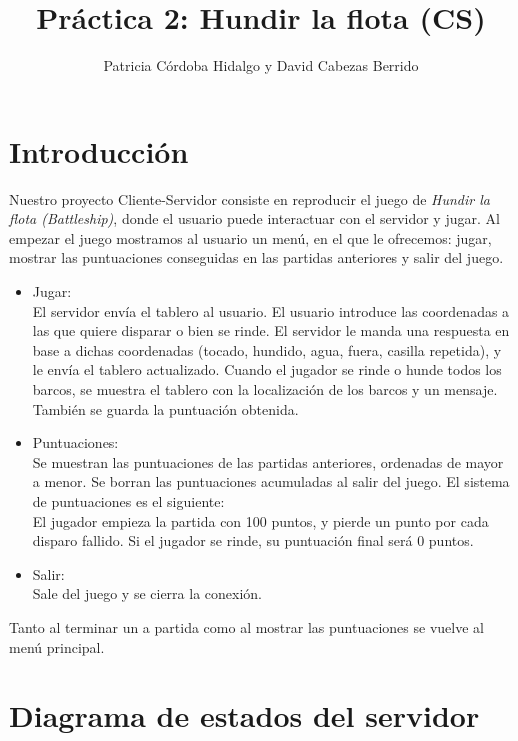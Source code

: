 \documentclass{article}
\begin{document}
\title{\Huge Práctica 2: Hundir la flota (CS)}
\author{Patricia Córdoba Hidalgo y David Cabezas Berrido}
\date{}
\maketitle

\tableofcontents
\newpage

\section{Introducción}

Nuestro proyecto Cliente-Servidor consiste en reproducir el juego de \textit{Hundir la flota (Battleship)}, donde el usuario puede interactuar con el servidor y jugar. Al empezar el juego mostramos al usuario un menú, en el que le ofrecemos: jugar, mostrar las puntuaciones conseguidas en las partidas anteriores y salir del juego.\\
\begin{itemize}
\item Jugar: \\
El servidor envía el tablero al usuario. El usuario introduce las coordenadas a las que quiere disparar o bien se rinde. El servidor le manda una respuesta en base a dichas coordenadas (tocado, hundido, agua, fuera, casilla repetida), y le envía el tablero actualizado. Cuando el jugador se rinde o hunde todos los barcos, se muestra el tablero con la localización de los barcos y un mensaje. También se guarda la puntuación obtenida.
  
\item Puntuaciones: \\
  Se muestran las puntuaciones de las partidas anteriores, ordenadas de mayor a menor. Se borran las puntuaciones acumuladas al salir del juego. El sistema de puntuaciones es el siguiente: \\ El jugador empieza la partida con 100 puntos, y pierde un punto por cada disparo fallido. Si el jugador se rinde, su puntuación final será 0 puntos.
\item Salir: \\
  Sale del juego y se cierra la conexión.
\end{itemize}

Tanto al terminar un a partida como al mostrar las puntuaciones se vuelve al menú principal.

\section{Diagrama de estados del servidor
}
\end{document}
